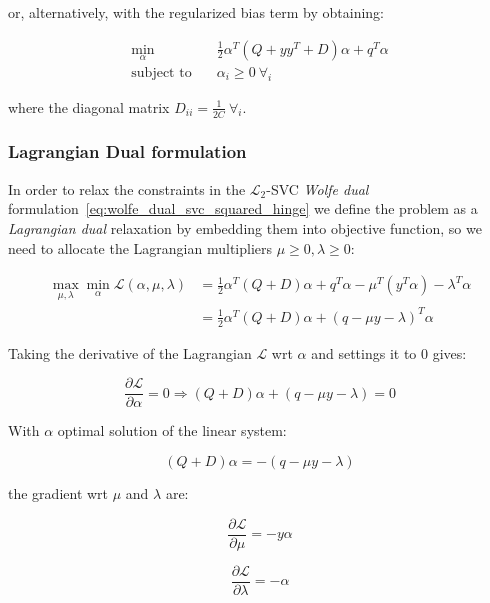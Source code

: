 or, alternatively, with the regularized bias term by obtaining:

\begin{equation} \label{eq:biased_wolfe_dual_svc_squared_hinge}
    \begin{aligned}
        \min_{\alpha} \quad & \frac{1}{2}\alpha^T (Q + yy^T + D) \alpha + q^T \alpha \\
            \text{subject to} \quad & \alpha_i \geq 0 \ \forall_i
    \end{aligned}
\end{equation}

where the diagonal matrix $\displaystyle D_{ii} = \frac{1}{2C} \ \forall_i$.

\subsubsection{Lagrangian Dual formulation}

In order to relax the constraints in the $\mathcal{L}_2$-SVC \emph{Wolfe dual} formulation~\eqref{eq:wolfe_dual_svc_squared_hinge} we define the problem as a \emph{Lagrangian dual} relaxation by embedding them into objective function, so we need to allocate the Lagrangian multipliers $\mu \geq 0, \lambda \geq 0$:

\begin{equation} \label{eq:l2_svc_lagrangian_dual}
	\begin{aligned}
		    \max_{\mu,\lambda} \min_{\alpha} \mathcal{L}(\alpha,\mu,\lambda) &= \frac{1}{2} \alpha^T (Q+D)\alpha+q^T\alpha - \mu^T (y^T \alpha) - \lambda^T \alpha \\
    &= \frac{1}{2} \alpha^T (Q+D)\alpha + (q - \mu y - \lambda)^T \alpha
	\end{aligned}
\end{equation}

Taking the derivative of the Lagrangian $\mathcal{L}$ wrt $\alpha$ and settings it to 0 gives:

\begin{equation} \label{eq:l2_svc_lagrangian_der_a}
	\frac{\partial \mathcal{L}}{\partial \alpha}=0\Rightarrow (Q+D) \alpha + (q - \mu y - \lambda) = 0
\end{equation}

With $\alpha$ optimal solution of the linear system:

\begin{equation} \label{eq:l2_svc_lagrangian_sol}
    (Q+D) \alpha = - (q - \mu y - \lambda)
\end{equation}

the gradient wrt $\mu$ and $\lambda$ are:

\begin{equation} \label{eq:l2_svc_lagrangian_der_mu}
	\frac{\partial \mathcal{L}}{\partial \mu}=-y \alpha
\end{equation}

\begin{equation} \label{eq:l2_svc_lagrangian_der_lambda}
    \frac{\partial \mathcal{L}}{\partial \lambda}=-\alpha
\end{equation}